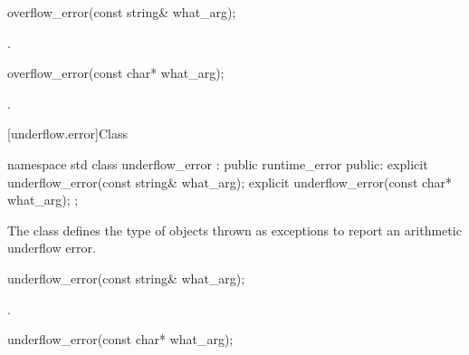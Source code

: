 %
\begin{itemdecl}
overflow_error(const string& what_arg);
\end{itemdecl}

\begin{itemdescr}
\pnum
{}

\pnum
\ensures
{}.
\end{itemdescr}

%
\begin{itemdecl}
overflow_error(const char* what_arg);
\end{itemdecl}

\begin{itemdescr}
\pnum
{}

\pnum
\ensures
{}.
\end{itemdescr}

[underflow.error]{Class }

%
\begin{codeblock}
namespace std {
  class underflow_error : public runtime_error {
  public:
    explicit underflow_error(const string& what_arg);
    explicit underflow_error(const char* what_arg);
  };
}
\end{codeblock}

\pnum
The class
defines the type of objects thrown as exceptions to report an arithmetic underflow error.

%
\begin{itemdecl}
underflow_error(const string& what_arg);
\end{itemdecl}

\begin{itemdescr}
\pnum
{}

\pnum
\ensures
{}.
\end{itemdescr}

%
\begin{itemdecl}
underflow_error(const char* what_arg);
\end{itemdecl}

